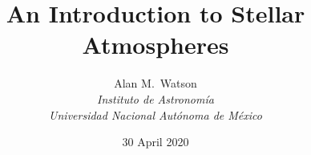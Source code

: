 
\date{30 April 2020}

\title{\Huge\bfseries An Introduction to Stellar Atmospheres}

\author{
\Large Alan M.\ Watson\\[0.5\baselineskip]
\Large \itshape Instituto de Astronomía\\[0.2\baselineskip]
\Large \itshape Universidad Nacional Autónoma de México
}

\maketitle


